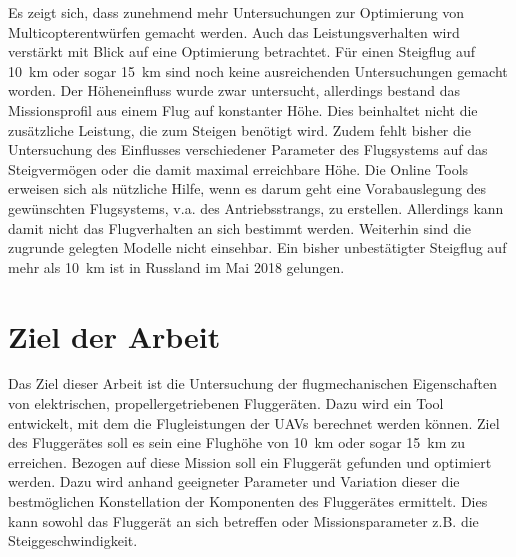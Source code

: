 Es zeigt sich, dass zunehmend mehr Untersuchungen zur Optimierung von Multicopterentwürfen gemacht werden. Auch das Leistungsverhalten wird verstärkt mit Blick auf eine Optimierung betrachtet. Für einen Steigflug auf \SI{10}{km} oder sogar \SI{15}{km} sind noch keine ausreichenden Untersuchungen gemacht worden. Der Höheneinfluss wurde zwar untersucht, allerdings bestand das Missionsprofil aus einem Flug auf konstanter Höhe. Dies beinhaltet nicht die zusätzliche Leistung, die zum Steigen benötigt wird. Zudem fehlt bisher die Untersuchung des Einflusses verschiedener Parameter des Flugsystems auf das Steigvermögen oder die damit maximal erreichbare Höhe. Die Online Tools erweisen sich als nützliche Hilfe, wenn es darum geht eine Vorabauslegung des gewünschten Flugsystems, v.a. des Antriebsstrangs, zu erstellen. Allerdings kann damit nicht das Flugverhalten an sich bestimmt werden. Weiterhin sind die zugrunde gelegten Modelle nicht einsehbar. Ein bisher unbestätigter Steigflug auf mehr als \SI{10}{km} ist \cite{Anderson.2018} in Russland im Mai 2018 gelungen. 


\section{Ziel der Arbeit}
\label{sec:ziel_der_atrbeit}
Das Ziel dieser Arbeit ist die Untersuchung der flugmechanischen Eigenschaften von elektrischen, propellergetriebenen Fluggeräten. Dazu wird ein Tool entwickelt, mit dem die Flugleistungen der UAVs berechnet werden können. Ziel des Fluggerätes soll es sein eine Flughöhe von \SI{10}{km} oder sogar \SI{15}{km} zu erreichen. Bezogen auf diese Mission soll ein Fluggerät gefunden und optimiert werden. Dazu wird anhand geeigneter Parameter und Variation dieser die bestmöglichen Konstellation der Komponenten des Fluggerätes ermittelt. Dies kann sowohl das Fluggerät an sich betreffen oder Missionsparameter z.B. die Steiggeschwindigkeit.

